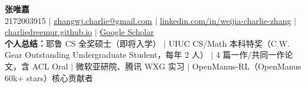\begin{center}
    \textbf{\Huge \scshape 张唯嘉} \\ \vspace{1pt}
    \footnotesize 2172003915 $|$ \href{mailto:zhangwj.charlie@gmail.com}{zhangwj.charlie@gmail.com} $|$
    \href{https://www.linkedin.com/in/weijia-charlie-zhang/}{\underline{linkedin.com/in/weijia-charlie-zhang}} $|$
    \href{https://charliedreemur.github.io}{\underline{charliedreemur.github.io}} $|$
    \href{https://scholar.google.com/citations?user=JN57tLsAAAAJ&hl=en}{\underline{Google Scholar}} \\
    \vspace{1pt}
    \footnotesize \textbf{个人总结：}耶鲁 CS 全奖硕士（即将入学） $|$ UIUC CS/Math 本科特奖（C.W. Gear Outstanding Undergraduate Student，每年 2 人） $|$ 4 篇一作/共同一作论文，含 ACL Oral $|$ 微软亚研院、腾讯 WXG 实习 $|$ OpenManus-RL（OpenManus 60k+ stars）核心贡献者
\end{center}
